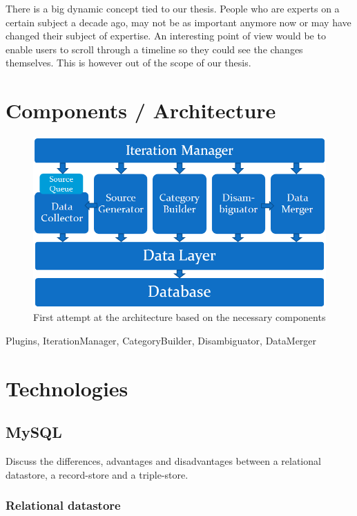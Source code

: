 There is a big dynamic concept tied to our thesis. People who are experts on a certain subject a decade ago, may not be as important anymore now or may have changed their subject of expertise. An interesting point of view would be to enable users to scroll through a timeline so they could see the changes themselves. This is however out of the scope of our thesis.

\section{Components / Architecture}

\begin{figure}[htbp]
	\centering
		\includegraphics[width=1.00\textwidth]{fig/architectuur.png}
	\caption{First attempt at the architecture based on the necessary components}
	\label{fig:architectuur}
\end{figure}

Plugins, IterationManager, CategoryBuilder, Disambiguator, DataMerger

\section{Technologies}

\subsection{MySQL}

Discuss the differences, advantages and disadvantages between a relational datastore, a record-store and a triple-store.

\subsubsection{Relational datastore}

